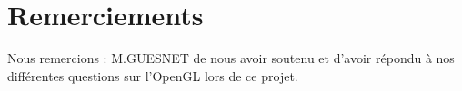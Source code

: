 \section*{Remerciements}

Nous remercions : \newline
	M.GUESNET de nous avoir soutenu et d'avoir répondu à nos différentes questions sur l'OpenGL lors de ce projet.\newline
